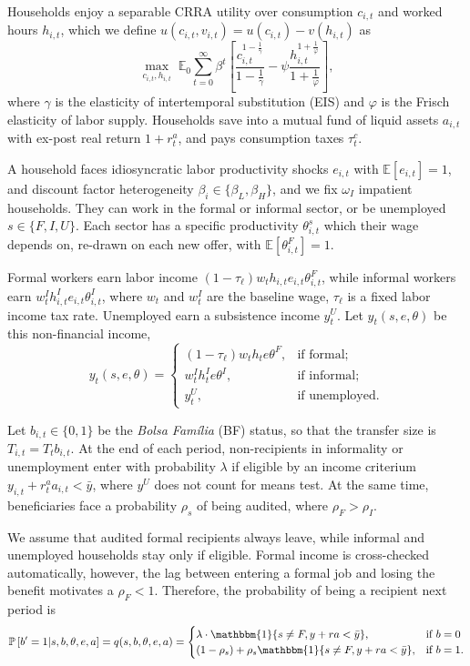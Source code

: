 \documentclass[12pt]{article}
\newcommand{\E}{\mathbb{E}}
\renewcommand{\P}{\mathbb{P}}
\begin{document}
Households enjoy a separable CRRA utility over consumption $c_{i,t}$ and worked hours
$h_{i,t}$, which we define $u(c_{i,t}, v_{i,t}) =  u(c_{i,t}) - v(h_{i,t})$ as
\[
\max_{c_{i,t},h_{i,t}} \; \E_0 \sum_{t=0}^\infty \beta^t \left[
\frac{c_{i,t}^{1-\frac{1}{\gamma}}}{1 - \frac{1}{\gamma}}
- \psi \frac{h_{i,t}^{1+\frac{1}{\varphi}}}{1+\frac{1}{\varphi}}
\right],
\]
where $\gamma$ is the elasticity of intertemporal substitution (EIS) and $\varphi$ is
the Frisch elasticity of labor supply. Households save into a mutual fund of liquid
assets $a_{i,t}$ with ex-post real return $1+r_t^a$, and pays consumption taxes
$\tau^c_t$.

A household faces idiosyncratic labor productivity shocks $e_{i,t}$ with
$\E[e_{i,t}] = 1$, and discount factor heterogeneity $\beta_i\in\{ \beta_L, \beta_H \}$,
and we fix $\omega_I$ impatient households. They can work in the formal or informal
sector, or be unemployed $s\in\{F,I,U\}$. Each sector has a specific productivity
$\theta^s_{i,t}$ which their wage depends on, re-drawn on each new offer, with
$\E\!\left[\theta^F_{i,t}\right] = 1$.

Formal workers earn labor income $(1-\tau_{\ell}) w_t h_{i,t} e_{i,t} \theta_{i,t}^F$,
while informal workers earn $w_t^I h_{i,t}^I e_{i,t} \theta_{i,t}^I$, where $w_t$ and
$w_t^I$ are the baseline wage, $\tau_{\ell}$ is a fixed labor income tax rate.
Unemployed earn a subsistence income $y_t^U$. Let $y_t(s,e,\theta)$ be this
non-financial income,
\[
    y_t(s,e,\theta) = \begin{cases}
        (1-\tau_\ell) w_t h_t e \theta^F, &\text{if formal;} \\
        w_t^I h_t^I e \theta^I, \quad &\text{if informal;} \\
        y_t^U, &\text{if unemployed}.
    \end{cases}
\]

Let $b_{i,t}\in\{0,1\}$ be the \textit{Bolsa Família} (BF) status, so that the transfer
size is $T_{i,t} = T_t b_{i,t}$. At the end of each period, non-recipients in
informality or unemployment enter with probability $\lambda$ if eligible by an income
criterium $y_{i,t} + r_t^a a_{i,t} < \bar y$, where $y^U$ does not count for means test.
At the same time, beneficiaries face a probability $\rho_s$ of being audited, where
$\rho_F > \rho_I$.

We assume that audited formal recipients always leave, while informal and unemployed
households stay only if eligible. Formal income is cross-checked automatically, however,
the lag between entering a formal job and losing the benefit motivates a $\rho_F < 1$.
Therefore, the probability of being a recipient next period is
\[
\P\left[b'=1 | s,b,\theta,e,a \right] = q(s,b,\theta,e,a)
= \begin{cases}
    \lambda \cdot \mathbbm{1}\{ s \neq F, y + r a < \bar y \}, &\text{if } b=0 \\
    (1-\rho_s) + \rho_s \mathbbm{1}\{ s \neq F, y + r a < \bar y \}, &\text{if } b=1.
\end{cases}
\]
\end{document}
